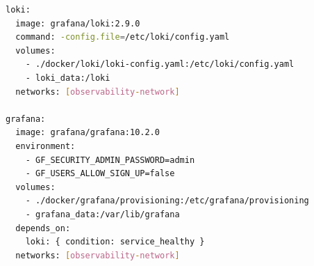 ﻿\documentclass[a4paper,12pt]{report}
\begin{document}
\vspace{0.5em}
\begin{securebox}[title={Livello 1 --- Loki e Grafana in docker-compose (observability-network)}]
\begin{lstlisting}[language=bash, caption={docker-compose.yml: servizi Loki e Grafana aggiunti}]
loki:
  image: grafana/loki:2.9.0
  command: -config.file=/etc/loki/config.yaml
  volumes:
    - ./docker/loki/loki-config.yaml:/etc/loki/config.yaml
    - loki_data:/loki
  networks: [observability-network]

grafana:
  image: grafana/grafana:10.2.0
  environment:
    - GF_SECURITY_ADMIN_PASSWORD=admin
    - GF_USERS_ALLOW_SIGN_UP=false
  volumes:
    - ./docker/grafana/provisioning:/etc/grafana/provisioning
    - grafana_data:/var/lib/grafana
  depends_on:
    loki: { condition: service_healthy }
  networks: [observability-network]
\end{lstlisting}
\end{securebox}
\end{document}
